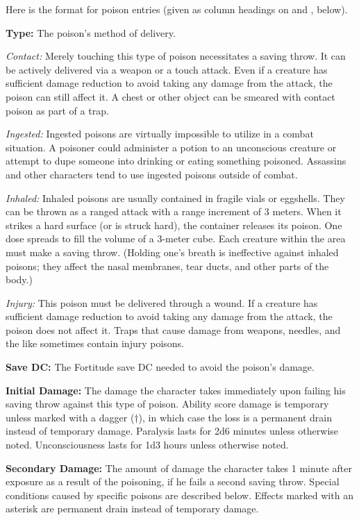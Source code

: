 Here is the format for poison entries (given as column headings on  and , below).

\textbf{Type:} The poison's method of delivery.

\textit{Contact:} Merely touching this type of poison necessitates a saving throw. It can be actively delivered via a weapon or a touch attack. Even if a creature has sufficient damage reduction to avoid taking any damage from the attack, the poison can still affect it. A chest or other object can be smeared with contact poison as part of a trap.

\textit{Ingested:} Ingested poisons are virtually impossible to utilize in a combat situation. A poisoner could administer a potion to an unconscious creature or attempt to dupe someone into drinking or eating something poisoned. Assassins and other characters tend to use ingested poisons outside of combat.

\textit{Inhaled:} Inhaled poisons are usually contained in fragile vials or eggshells. They can be thrown as a ranged attack with a range increment of 3 meters. When it strikes a hard surface (or is struck hard), the container releases its poison. One dose spreads to fill the volume of a 3-meter cube. Each creature within the area must make a saving throw. (Holding one's breath is ineffective against inhaled poisons; they affect the nasal membranes, tear ducts, and other parts of the body.)

\textit{Injury:} This poison must be delivered through a wound. If a creature has sufficient damage reduction to avoid taking any damage from the attack, the poison does not affect it. Traps that cause damage from weapons, needles, and the like sometimes contain injury poisons.

\textbf{Save DC:} The Fortitude save DC needed to avoid the poison's damage.

\textbf{Initial Damage:} The damage the character takes immediately upon failing his saving throw against this type of poison. Ability score damage is temporary unless marked with a dagger ($\dagger$), in which case the loss is a permanent drain instead of temporary damage. Paralysis lasts for 2d6 minutes unless otherwise noted. Unconsciousness lasts for 1d3 hours unless otherwise noted.

\textbf{Secondary Damage:} The amount of damage the character takes 1 minute after exposure as a result of the poisoning, if he fails a second saving throw. Special conditions caused by specific poisons are described below. Effects marked with an asterisk are permanent drain instead of temporary damage.

